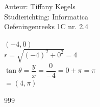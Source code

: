 \documentclass[a4paper]{article}
\begin{document}
  
\noindent \large Auteur: Tiffany Kegels \\
\noindent \large Studierichting: Informatica\\
\noindent \large Oefeningenreeks 1C nr. 2.4\\

\medskip

\normalsize

$( -4, 0)$\\

$r = \sqrt{(-4)^2 + 0^2} = 4$\\

$\tan \theta = \dfrac{y}{x} = \dfrac{0}{-4} = 0 + \pi = \pi$\\

$= (4,\pi)$\\


\begin{thebibliography}{999}

\end{thebibliography}
\end{document}
